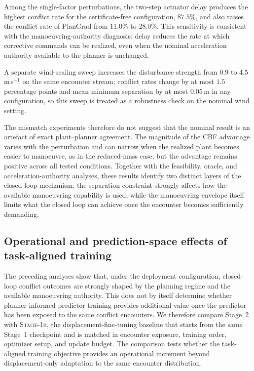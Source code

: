 \documentclass[11pt]{article}
\theoremstyle{plain}
\theoremstyle{definition}
\newcommand{\method}{PlanGrad}
\begin{document}
Among the single-factor perturbations, the two-step actuator delay
produces the highest conflict rate for the certificate-free
configuration, $87.5\%$, and also raises the conflict rate of
\method{} from $11.0\%$ to $28.0\%$. This sensitivity is consistent
with the manoeuvring-authority diagnosis: delay reduces the rate at
which corrective commands can be realized, even when the nominal
acceleration authority available to the planner is unchanged.

A separate wind-scaling sweep increases the disturbance strength from
$0.9$ to $4.5$\,m\,s$^{-1}$ on the same encounter stream; conflict
rates change by at most $1.5$ percentage points and mean minimum
separation by at most $0.05$\,m in any configuration, so this sweep is
treated as a robustness check on the nominal wind setting.

The mismatch experiments therefore do not suggest that the nominal
result is an artefact of exact plant--planner agreement. The magnitude
of the CBF advantage varies with the perturbation and can narrow when
the realized plant becomes easier to manoeuvre, as in the reduced-mass
case, but the advantage remains positive across all tested conditions.
Together with the feasibility, oracle, and acceleration-authority
analyses, these results identify two distinct layers of the closed-loop
mechanism: the separation constraint strongly affects how the
available manoeuvring capability is used, while the manoeuvring
envelope itself limits what the closed loop can achieve once the
encounter becomes sufficiently demanding.

\subsection{Operational and prediction-space effects of task-aligned training}
\label{sec:results-signal}

The preceding analyses show that, under the deployment configuration,
closed-loop conflict outcomes are strongly shaped by the planning
regime and the available manoeuvring authority. This does not by
itself determine whether planner-informed predictor training provides
additional value once the predictor has been exposed to the same
conflict encounters. We therefore compare Stage~2 with
\textsc{Stage-1b}, the displacement-fine-tuning baseline that starts
from the same Stage~1 checkpoint and is matched in encounter exposure,
training order, optimizer setup, and update budget. The comparison
tests whether the task-aligned training objective provides an
operational increment beyond displacement-only adaptation to the same
encounter distribution.
\end{document}
